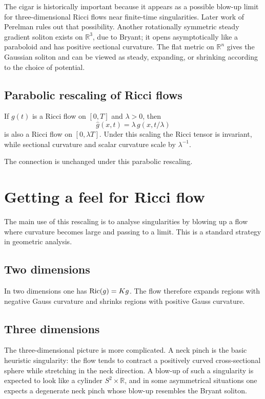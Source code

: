 The cigar is historically important because it appears as a possible blow-up
limit for three-dimensional Ricci flows near finite-time singularities. Later
work of Perelman rules out that possibility. Another rotationally symmetric
steady gradient soliton exists on $\mathbb R^3$, due to Bryant; it opens
asymptotically like a paraboloid and has positive sectional curvature. The flat
metric on $\mathbb R^n$ gives the Gaussian soliton and can be viewed as steady,
expanding, or shrinking according to the choice of potential.

\subsection{Parabolic rescaling of Ricci flows}

\begin{remark}
\label{topping-intro-parabolic-rescaling}
If $g(t)$ is a Ricci flow on $[0,T]$ and $\lambda>0$, then
\[
\hat g(x,t)=\lambda\, g(x,t/\lambda)
\]
is also a Ricci flow on $[0,\lambda T]$. Under this scaling the Ricci tensor is
invariant, while sectional curvature and scalar curvature scale by
$\lambda^{-1}$.
\end{remark}

The connection is unchanged under this parabolic rescaling.

\section{Getting a feel for Ricci flow}

The main use of this rescaling is to analyse singularities by blowing up a flow
where curvature becomes large and passing to a limit. This is a standard
strategy in geometric analysis.

\subsection{Two dimensions}

In two dimensions one has $\operatorname{Ric}(g)=Kg$. The flow therefore expands regions with
negative Gauss curvature and shrinks regions with positive Gauss curvature.

\subsection{Three dimensions}

The three-dimensional picture is more complicated. A neck pinch is the basic
heuristic singularity: the flow tends to contract a positively curved
cross-sectional sphere while stretching in the neck direction. A blow-up of
such a singularity is expected to look like a cylinder $S^2\times\mathbb R$,
and in some asymmetrical situations one expects a degenerate neck pinch whose
blow-up resembles the Bryant soliton.

